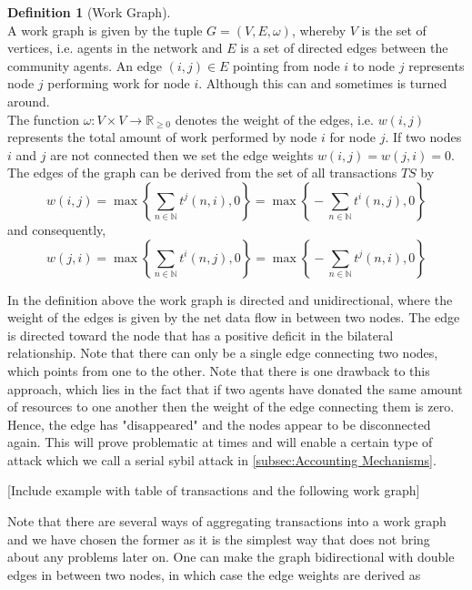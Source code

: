 \documentclass[11pt,a4paper]{article}
\theoremstyle{definition}
\newtheorem{definition}{Definition}[section]
\theoremstyle{theorem}
\theoremstyle{proposition}
\theoremstyle{corollary}
\theoremstyle{lemma}
\theoremstyle{example}
\theoremstyle{remark}
\begin{document}
\begin{definition}[Work Graph]\ \\
A work graph is given by the tuple $G = (V, E, \omega)$, whereby $V$ is the set of vertices, i.e. agents in the network and $E$ is a set of directed edges between the community agents. An edge $(i,j)\in{}E$ pointing from node $i$ to node $j$ represents node $j$ performing work for node $i$. Although this can and sometimes is turned around.\\ The function $\omega:V\times{}V\rightarrow{}\mathbb{R}_{\geq{}0}$ denotes the weight of the edges, i.e. $w(i,j)$ represents the total amount of work performed by node $i$ for node $j$. If two nodes $i$ and $j$ are not connected then we set the edge weights $w(i,j)=w(j,i)=0$. The edges of the graph can be derived from the set of all transactions $TS$ by
\[
w(i,j) = \max\left\lbrace{}\sum\limits_{n\in\mathbb{N}}t^j(n,i), 0\right\rbrace = \max\left\lbrace{}-\sum\limits_{n\in\mathbb{N}}t^i(n,j), 0\right\rbrace
\]
and consequently, 
\[
w(j,i) = \max\left\lbrace{}\sum\limits_{n\in\mathbb{N}}t^i(n,j), 0\right\rbrace = \max\left\lbrace{}-\sum\limits_{n\in\mathbb{N}}t^j(n,i), 0\right\rbrace
\]
\end{definition}

\noindent{}In the definition above the work graph is directed and unidirectional, where the weight of the edges is given by the net data flow in between two nodes. The edge is directed toward the node that has a positive deficit in the bilateral relationship. Note that there can only be a single edge connecting two nodes, which points from one to the other. Note that there is one drawback to this approach, which lies in the fact that if two agents have donated the same amount of resources to one another then the weight of the edge connecting them is zero. Hence, the edge has "disappeared" and the nodes appear to be disconnected again. This will prove problematic at times and will enable a certain type of attack which we call a serial sybil attack in \ref{subsec:Accounting Mechanisms}. \vspace{1em}\\

\begin{center} [Include example with table of transactions and the following work graph] \vspace{1em}\\ \end{center}

\noindent{}Note that there are several ways of aggregating transactions into a work graph and we have chosen the former as it is the simplest way that does not bring about any problems later on. One can make the graph bidirectional with double edges in between two nodes, in which case the edge weights are derived as 
\end{document}
